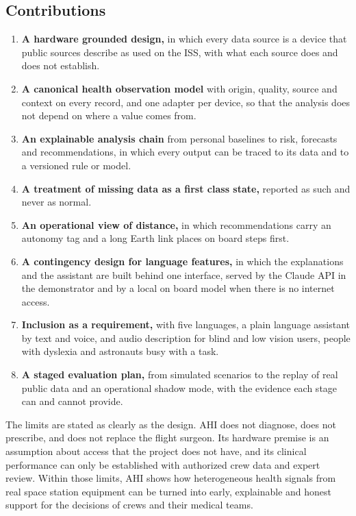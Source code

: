 \subsection{Contributions}
\label{subsec:contributions}

\begin{enumerate}
\item \textbf{A hardware grounded design,} in which every data source is a device that public sources describe as used on the ISS, with what each source does and does not establish.
\item \textbf{A canonical health observation model} with origin, quality, source and context on every record, and one adapter per device, so that the analysis does not depend on where a value comes from.
\item \textbf{An explainable analysis chain} from personal baselines to risk, forecasts and recommendations, in which every output can be traced to its data and to a versioned rule or model.
\item \textbf{A treatment of missing data as a first class state,} reported as such and never as normal.
\item \textbf{An operational view of distance,} in which recommendations carry an autonomy tag and a long Earth link places on board steps first.
\item \textbf{A contingency design for language features,} in which the explanations and the assistant are built behind one interface, served by the Claude API in the demonstrator and by a local on board model when there is no internet access.
\item \textbf{Inclusion as a requirement,} with five languages, a plain language assistant by text and voice, and audio description for blind and low vision users, people with dyslexia and astronauts busy with a task.
\item \textbf{A staged evaluation plan,} from simulated scenarios to the replay of real public data and an operational shadow mode, with the evidence each stage can and cannot provide.
\end{enumerate}

The limits are stated as clearly as the design. AHI does not diagnose, does not prescribe, and does not replace the flight surgeon. Its hardware premise is an assumption about access that the project does not have, and its clinical performance can only be established with authorized crew data and expert review. Within those limits, AHI shows how heterogeneous health signals from real space station equipment can be turned into early, explainable and honest support for the decisions of crews and their medical teams.
